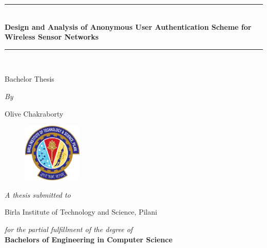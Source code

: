 \documentclass[a4paper,12pt]{report}
\newcommand{\HRule}{\rule{\linewidth}{0.5mm}}
\begin{document}
\begin{titlepage}
\begin{center}
\HRule \\[0.4cm]
{\huge \bfseries \textbf{Design and Analysis of Anonymous User Authentication Scheme for Wireless Sensor Networks}  \\[0.4cm] }
\HRule \\[1cm]
\end{center}
\vspace{0.2cm}
\begin{center}
{\LARGE{Bachelor Thesis}}
\end{center}
\vspace{0.25cm}
\begin{center}
{\large {\textit{By}}}
\end{center}
\vspace{0.35cm}
\begin{center}
{\LARGE{Olive Chakraborty}}
\end{center}
\vspace{0.25cm}

\begin{figure}[h]
    \centering
        \includegraphics[width=0.25\textwidth]{pilani}
\end{figure}

\vspace{0.5cm}

\begin{center}
{\textit{\Large{A thesis submitted to}}}\\
\end{center}
\vspace{0.25cm}
\begin{center}
{\Large{Birla Institute of Technology and Science, Pilani}}\\
\end{center}

\vspace{0.35cm}

\begin{center}
\textit{\large {for the partial fulfillment of the degree of}}\\
\vspace{0.8cm}
 \textbf{\Large{Bachelors of Engineering in Computer Science}}\\
\end{center}


\end{titlepage}
\end{document}
